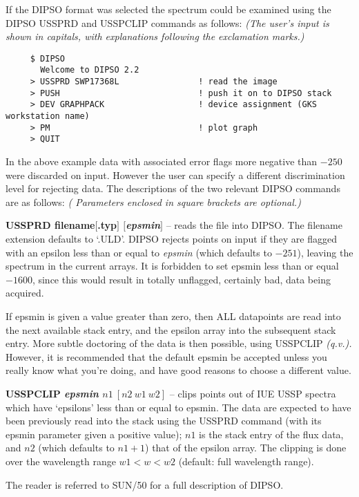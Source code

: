 If the DIPSO format was selected the spectrum could be examined using
the DIPSO USSPRD and USSPCLIP commands as follows: {\sl (The user's input is
shown in capitals, with explanations following the exclamation marks.)}
\begin{verbatim}
     $ DIPSO
       Welcome to DIPSO 2.2
     > USSPRD SWP17368L                ! read the image
     > PUSH                            ! push it on to DIPSO stack
     > DEV GRAPHPACK                   ! device assignment (GKS workstation name)
     > PM                              ! plot graph
     > QUIT                            
\end{verbatim}
In the above example data with associated error flags more negative than $-250$
were discarded on input.
However the user can specify a different discrimination level for rejecting
data.
The descriptions of the two relevant DIPSO commands are as follows:
{\sl( Parameters enclosed in square brackets are optional.)}
\begin{description}
\item{\bf USSPRD filename$[$.typ$]$ $[${\it epsmin}$]$} --
reads the file into DIPSO. The filename extension defaults to `.ULD'.   
DIPSO rejects points on input if they are flagged with an epsilon less than or
equal to {\it epsmin} (which defaults to $-251$), leaving the spectrum in
the current arrays.
It is forbidden to set epsmin less than or equal $-1600$, since this would
result in totally unflagged, certainly bad, data being acquired.

If epsmin is given a value greater than zero, then ALL datapoints are
read into the next available stack entry, and the epsilon array into
the subsequent stack entry.   More subtle doctoring of the data is then
possible, using USSPCLIP {\it(q.v.).}   However, it is recommended that the
default epsmin be accepted unless you really know what you're doing,
and have good reasons to choose a different value.

\item{\bf USSPCLIP {\it epsmin} $n1\ [n2\ w1\ w2]$} --
clips points out of IUE USSP spectra which have `epsilons' less than
or equal to epsmin.
The data are expected to have been previously read into the stack
using the USSPRD command (with its epsmin parameter given a positive
value);
$n1$ is the stack entry of the flux data, and $n2$ (which defaults
to $n1+1$) that of the epsilon array.
The clipping is done over the wavelength range $w1<w<w2$ (default:
full wavelength range).

\end{description}

The reader  is referred to SUN/50 for a full description of DIPSO.



